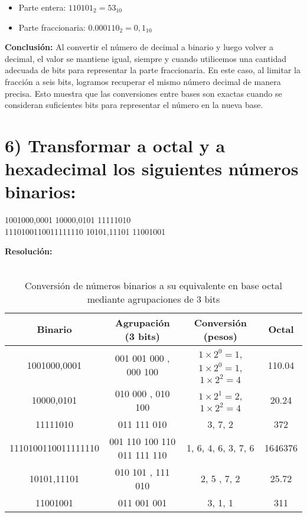 \documentclass[12pt]{article}
\begin{document}
\begin{itemize}
    \item Parte entera: $110101_2 = 53_{10}$
    \item Parte fraccionaria: $0.000110_2 = 0,1_{10}$
\end{itemize}


\textbf{Conclusión:} Al convertir el número de decimal a binario y luego volver a decimal, el valor se mantiene igual, siempre y cuando utilicemos una cantidad adecuada de bits para representar la parte fraccionaria. En este caso, al limitar la fracción a seis bits, logramos recuperar el mismo número decimal de manera precisa. Esto muestra que las conversiones entre bases son exactas cuando se consideran suficientes bits para representar el número en la nueva base.\\


\section*{6) Transformar a octal y a hexadecimal los siguientes números binarios:}

\begin{center}
1001000{,}0001 \hspace{1.5cm} 10000{,}0101 \hspace{1.5cm} 11111010 \\
1110100110011111110 \hspace{1.5cm} 10101{,}11101 \hspace{1.5cm} 11001001
\end{center}


\textbf{Resolución:} \\\\


\begin{table}[H]
	\centering
	\renewcommand{\arraystretch}{1.3}
	\begin{tabular}{|c|c|c|c|}
		\hline
		\textbf{Binario} & \textbf{Agrupación (3 bits)} & \textbf{Conversión (pesos)} & \textbf{Octal} \\
		\hline
		1001000,0001 & 001 001 000 , 000 100 & $1\times2^0=1$, $1\times2^0=1$, $1\times2^2=4$ & 110.04 \\
		\hline
		10000,0101 & 010 000 , 010 100 & $1\times2^1=2$, $1\times2^2=4$ & 20.24 \\
		\hline
		11111010 & 011 111 010 & 3, 7, 2 & 372 \\
		\hline
		1110100110011111110 & 001 110 100 110 011 111 110 & 1, 6, 4, 6, 3, 7, 6 & 1646376 \\
		\hline
		10101,11101 & 010 101 , 111 010 & 2, 5 , 7, 2 & 25.72 \\
		\hline
		11001001 & 011 001 001 & 3, 1, 1 & 311 \\
		\hline
	\end{tabular}
	\caption{Conversión de números binarios a su equivalente en base octal mediante agrupaciones de 3 bits}
\end{table}
\end{document}

